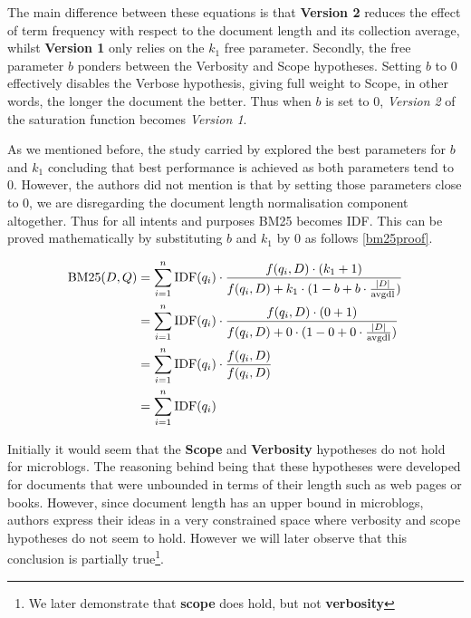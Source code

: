The main difference between these equations is that \textbf{Version 2} reduces the effect of term frequency with respect to the document length and its collection average, whilst \textbf{Version 1} only relies on the \(k_1\) free parameter. Secondly, the free parameter \(b\) ponders between the Verbosity and Scope hypotheses. Setting \(b\) to 0 effectively disables the Verbose hypothesis, giving full weight to Scope, in other words, the longer the document the better. Thus when \(b\) is set to 0, \textit{Version 2} of the saturation function becomes \textit{Version 1}.

As we mentioned before, the study carried by \cite{ferguson2012investigation} explored the best parameters for \(b\) and \(k_1\) concluding that best performance is achieved as both parameters tend to 0. However, the authors did not mention is that by setting those parameters close to 0, we are disregarding the document length normalisation component altogether. Thus for all intents and purposes BM25 becomes IDF. This can be proved mathematically by substituting \(b\) and \(k_1\) by 0 as follows \ref{bm25proof}.

\begin{small}
\begin{align}
\label{bm25proof}
    \notag \text{BM25}(D,Q) &= \sum_{i=1}^{n} \text{IDF}(q_i) \cdot \frac{f(q_i, D) \cdot (k_1 + 1)}{f(q_i, D) + k_1 \cdot (1 - b + b \cdot \frac{|D|}{\text{avgdl}})} \\
  \notag&= \sum_{i=1}^{n} \text{IDF}(q_i) \cdot \frac{f(q_i, D) \cdot (0 + 1)}{f(q_i, D) + 0 \cdot (1 - 0 + 0 \cdot \frac{|D|}{\text{avgdl}})} \\
  \notag&= \sum_{i=1}^{n} \text{IDF}(q_i) \cdot \frac{f(q_i, D)}{f(q_i, D) } \\
  &= \sum_{i=1}^{n} \text{IDF}(q_i)              
\end{align}
\end{small}

Initially it would seem that the \textbf{Scope} and \textbf{Verbosity} hypotheses do not hold for microblogs. The reasoning behind being that these hypotheses were developed for documents that were unbounded in terms of their length such as web pages or books. However, since document length has an upper bound in microblogs, authors express their ideas in a very constrained space where verbosity and scope hypotheses do not seem to hold. However we will later observe that this conclusion is partially true\footnote{We later demonstrate that \textbf{scope} does hold, but not \textbf{verbosity}}.

